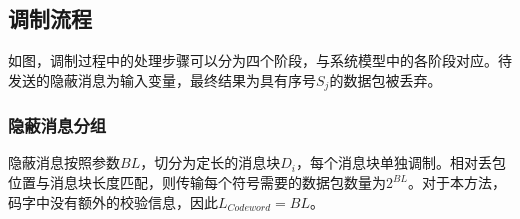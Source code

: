 \subsection{调制流程}
\label{chap:zigzag:model:modulation}


如图，调制过程中的处理步骤可以分为四个阶段，与系统模型中的各阶段对应。待发送的隐蔽消息为输入变量，最终结果为具有序号$S_{j}$的数据包被丢弃。

\subsubsection{隐蔽消息分组}
\label{chap:zigzag:model:modulation:segment}
隐蔽消息按照参数$BL$，切分为定长的消息块$D_{i}$，每个消息块单独调制。相对丢包位置与消息块长度匹配，则传输每个符号需要的数据包数量为$2^{BL}$。对于本方法，码字中没有额外的校验信息，因此$L_{Codeword}=BL$。


